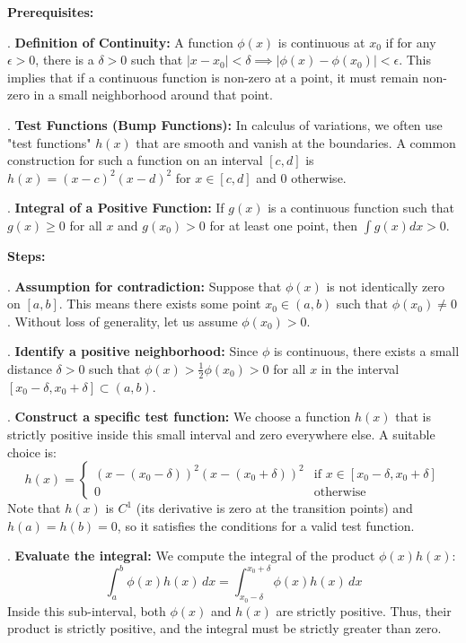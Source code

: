 \begin{solution}
\textbf{Prerequisites:}
\par{}. \textbf{Definition of Continuity:} A function $\phi(x)$ is continuous at $x_0$ if for any $\epsilon > 0$, there is a $\delta > 0$ such that $|x - x_0| < \delta \implies |\phi(x) - \phi(x_0)| < \epsilon$. This implies that if a continuous function is non-zero at a point, it must remain non-zero in a small neighborhood around that point.
\par{}. \textbf{Test Functions (Bump Functions):} In calculus of variations, we often use "test functions" $h(x)$ that are smooth and vanish at the boundaries. A common construction for such a function on an interval $[c, d]$ is $h(x) = (x-c)^2 (x-d)^2$ for $x \in [c, d]$ and $0$ otherwise.
\par{}. \textbf{Integral of a Positive Function:} If $g(x)$ is a continuous function such that $g(x) \geq 0$ for all $x$ and $g(x_0) > 0$ for at least one point, then $\int g(x) dx > 0$.
\par\medskip
\textbf{Steps:}
\par{}. \textbf{Assumption for contradiction:} Suppose that $\phi(x)$ is not identically zero on $[a,b]$. This means there exists some point $x_0 \in (a,b)$ such that $\phi(x_0) \neq 0$. Without loss of generality, let us assume $\phi(x_0) > 0$.
\par{}. \textbf{Identify a positive neighborhood:} Since $\phi$ is continuous, there exists a small distance $\delta > 0$ such that $\phi(x) > \frac{1}{2}\phi(x_0) > 0$ for all $x$ in the interval $[x_0 - \delta, x_0 + \delta] \subset (a,b)$. 
\par{}. \textbf{Construct a specific test function:} We choose a function $h(x)$ that is strictly positive inside this small interval and zero everywhere else. A suitable choice is:
\[ h(x) = \begin{cases} (x - (x_0-\delta))^2 (x - (x_0+\delta))^2 & \text{if } x \in [x_0 - \delta, x_0 + \delta] \\ 0 & \text{otherwise} \end{cases} \]
Note that $h(x)$ is $C^1$ (its derivative is zero at the transition points) and $h(a) = h(b) = 0$, so it satisfies the conditions for a valid test function.
\par{}. \textbf{Evaluate the integral:} We compute the integral of the product $\phi(x)h(x)$:
\[ \int_a^b \phi(x)h(x) \, dx = \int_{x_0-\delta}^{x_0+\delta} \phi(x)h(x) \, dx \]
Inside this sub-interval, both $\phi(x)$ and $h(x)$ are strictly positive. Thus, their product is strictly positive, and the integral must be strictly greater than zero.

\end{solution}
